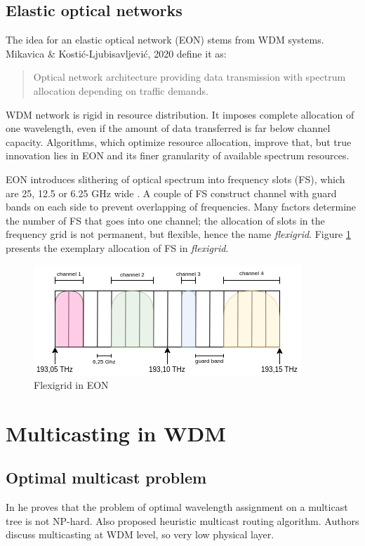 \documentclass[conference]{IEEEtran}
\begin{document}
\subsection{Elastic optical networks}
The idea for an elastic optical network (EON) stems from WDM systems. Mikavica \& Kostić-Ljubisavljević, 2020 \cite{eon_definition} define it as:

\begin{quote}
Optical network architecture providing data transmission with spectrum allocation depending on traffic demands.
\end{quote}

WDM network is rigid in resource distribution. It imposes complete allocation of one wavelength, even if the amount of data transferred is far below channel capacity. Algorithms, which optimize resource allocation, improve that, but true innovation lies in EON and its finer granularity of available spectrum resources.

EON introduces slithering of optical spectrum into frequency slots (FS), which are 25, 12.5 or 6.25 GHz wide \cite{eon_fs}. A couple of FS construct channel with guard bands on each side to prevent overlapping of frequencies. Many factors determine the number of FS that goes into one channel; the allocation of slots in the frequency grid is not permanent, but flexible, hence the name \textit{flexigrid}. Figure \ref{eon_flexigrid} presents the exemplary allocation of FS in \textit{flexigrid}.

\begin{figure}[htbp]
	\centerline{\includegraphics[scale=0.65]{flexigrid.png}}
	\caption{Flexigrid in EON}
	\label{eon_flexigrid}
\end{figure}

\section{Multicasting in WDM}

\subsection{Optimal multicast problem}
In \cite{wdm_biaochen} he proves that the problem of optimal wavelength assignment on a multicast tree is not NP-hard. Also proposed heuristic multicast routing algorithm. Authors discuss multicasting at WDM level, so very low physical layer.
\end{document}
